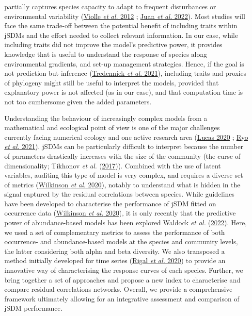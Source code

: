 \documentclass[9pt,biorxiv,doublespacing,lineno,endfloat]{lapreprint}
\begin{document}
partially captures species capacity to adapt to frequent disturbances or
environmental variability (\protect\hyperlink{ref-Violle_2012}{Violle
\emph{et al.} 2012} ; \protect\hyperlink{ref-deJuan_2022}{Juan \emph{et
al.} 2022}). Most studies will face the same trade-off between the
potential benefit of including traits within jSDMs and the effort needed
to collect relevant information. In our case, while including traits did
not improve the model's predictive power, it provides knowledge that is
useful to understand the response of species along environmental
gradients, and set-up management strategies. Hence, if the goal is not
prediction but inference
(\protect\hyperlink{ref-Tredennick_2021}{Tredennick \emph{et al.}
2021}), including traits and proxies of phylogeny might still be useful
to interpret the models, provided that explanatory power is not affected
(as in our case), and that computation time is not too cumbersome given
the added parameters.

Understanding the behaviour of increasingly complex models from a
mathematical and ecological point of view is one of the major challenges
currently facing numerical ecology and one active research area
(\protect\hyperlink{ref-Lucas_2020}{Lucas 2020} ;
\protect\hyperlink{ref-Ryo_2021}{Ryo \emph{et al.} 2021}). jSDMs can be
particularly difficult to interpret because the number of parameters
drastically increases with the size of the community (the curse of
dimensionality; Tikhonov \emph{et al.}
(\protect\hyperlink{ref-Tikhonov_2017}{2017})). Combined with the use of
latent variables, auditing this type of model is very complex, and
requires a diverse set of metrics
(\protect\hyperlink{ref-Wilkinson_2020}{Wilkinson \emph{et al.} 2020}),
notably to understand what is hidden in the signal captured by the
residual correlations between species. While guidelines have been
developed to characterise the performance of jSDM fitted on occurrence
data (\protect\hyperlink{ref-Wilkinson_2020}{Wilkinson \emph{et al.}
2020}), it is only recently that the predictive power of abundance-based
models has been explored Waldock \emph{et al.}
(\protect\hyperlink{ref-Waldock_2022}{2022}). Here, we used a set of
complementary metrics to assess the performance of both occurrence- and
abundance-based models at the species and community levels, the latter
considering both alpha and beta diversity. We also transposed a method
initially developed for time series
(\protect\hyperlink{ref-Rigal_2020}{Rigal \emph{et al.} 2020}) to
provide an innovative way of characterising the response curves of each
species. Further, we bring together a set of approaches and propose a
new index to characterise and compare residual correlations networks.
Overall, we provide a comprehensive framework ultimately allowing for an
integrative assessment and comparison of jSDM performance.
\end{document}
